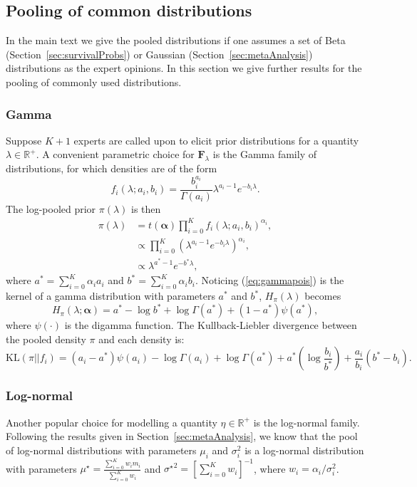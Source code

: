 \documentclass[a4paper, notitlepage, 10pt]{article}
\begin{document}
\subsection{Pooling of common distributions}
\label{sec:common_poolings}

In the main text we give the pooled distributions if one assumes a set of Beta (Section~\ref{sec:survivalProbs}) or Gaussian (Section~\ref{sec:metaAnalysis}) distributions as the expert opinions.
In this section we give further results for the pooling of commonly used distributions.

\subsubsection{Gamma}
\label{sec:gamma}
Suppose $K + 1$ experts are called upon to elicit prior distributions for a quantity $\lambda \in \mathbb{R}^+$.
A convenient parametric choice for $\mathbf{F}_\lambda$ is the Gamma family of distributions, for which densities are of the form
$$ f_i(\lambda;a_i,b_i) = \frac{b_i^{a_i}}{\Gamma(a_i)} \lambda^{a_i-1} e^{-b_i\lambda}.$$
The log-pooled prior $\pi(\lambda)$ is then
\begin{align}
\nonumber
\pi(\lambda)&= t(\boldsymbol\alpha)\prod_{i=0}^{K}f_i(\lambda;a_i,b_i)^{\alpha_i},\\
\nonumber
&\propto \prod_{i=0}^{K} \left(\lambda^{a_i-1} e^{-b_i\lambda}\right)^{\alpha_i},\\
\label{eq:gammapois}
&\propto \lambda^{a^*-1} e^{-b^*\lambda},
\end{align}
where $a^* =\sum_{i=0}^{K}\alpha_ia_i$ and $b^* = \sum_{i=0}^{K}\alpha_ib_i$.
Noticing (\ref{eq:gammapois}) is the kernel of a gamma distribution with parameters $a^*$ and $b^*$, $H_{\pi}(\lambda)$ becomes
\begin{equation}
\label{eq:entropygamma}
H_{\pi}(\lambda; \boldsymbol\alpha) = a^* - \log b^* + \log \Gamma(a^*) + (1-a^*)\psi(a^*),
\end{equation}
where $\psi(\cdot)$ is the digamma function.
The Kullback-Liebler divergence between the pooled density $\pi$ and each density is:
\begin{equation}
 \label{eq:KLgamma}
 \text{KL}(\pi || f_i) = (a_i-a^*)\psi(a_i) - \log\Gamma(a_i) + \log\Gamma(a^*) + a^*\left(\log\frac{b_i}{b^*}\right) + \frac{a_i}{b_i}(b^*-b_i).
\end{equation}

\subsubsection{Log-normal} 
\label{sec:lognormal}
Another popular choice for modelling a quantity $\eta \in \mathbb{R}^+$ is the log-normal family.
Following the results given in Section~\ref{sec:metaAnalysis}, we know that the pool of log-normal distributions with parameters $\mu_i$ and $\sigma_i^2$ is a log-normal distribution with parameters $\mu^\star = \frac{\sum_{i=0}^K w_im_i}{\sum_{i=0}^K w_i}$ and ${\sigma^\star}^2 = [\sum_{i=0}^K w_i]^{-1}$,  where $w_i = \alpha_i/\sigma_i^2$.
\end{document}

